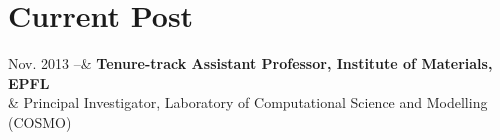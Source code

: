 \section{ Current Post}
\begin{datetable}
Nov. 2013 --& \textbf{Tenure-track Assistant Professor, Institute of Materials, EPFL}\\
         & Principal Investigator, Laboratory of Computational Science and Modelling (COSMO)
\end{datetable}

